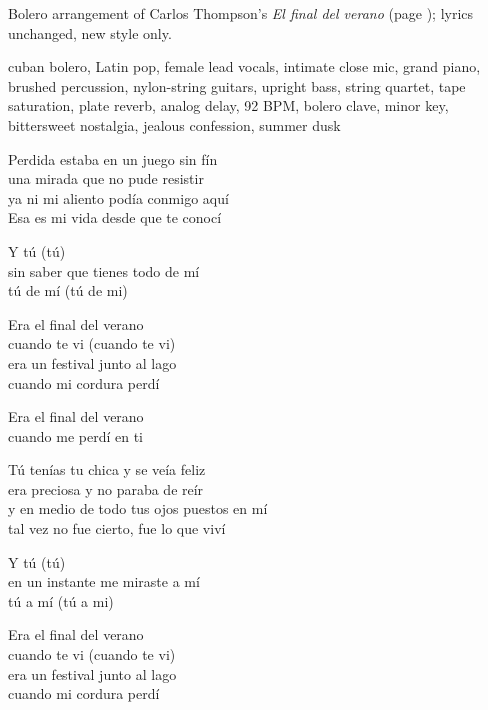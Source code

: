 
\begin{notes}
Bolero arrangement of Carlos Thompson's \emph{El final del verano} (page \pageref{sec:verano}); lyrics unchanged, new style only.
\end{notes}
\begin{style}
cuban bolero, Latin pop, female lead vocals, intimate close mic, grand piano, brushed percussion, nylon-string guitars, upright bass, string quartet, tape saturation, plate reverb, analog delay, 92 BPM, bolero clave, minor key, bittersweet nostalgia, jealous confession, summer dusk
\end{style}
\begin{lyrics}
Perdida estaba en un juego sin fín\\
una mirada que no pude resistir\\
ya ni mi aliento podía conmigo aquí\\
Esa es mi vida desde que te conocí

Y tú (tú)\\
sin saber que tienes todo de mí\\
tú de mí (tú de mi)

Era el final del verano\\
cuando te vi (cuando te vi)\\
era un festival junto al lago\\
cuando mi cordura perdí

Era el final del verano\\
cuando me perdí en ti

Tú tenías tu chica y se veía feliz\\
era preciosa y no paraba de reír\\
y en medio de todo tus ojos puestos en mí\\
tal vez no fue cierto, fue lo que viví

Y tú (tú)\\
en un instante me miraste a mí\\
tú a mí (tú a mi)

Era el final del verano\\
cuando te vi (cuando te vi)\\
era un festival junto al lago\\
cuando mi cordura perdí


\end{lyrics}
